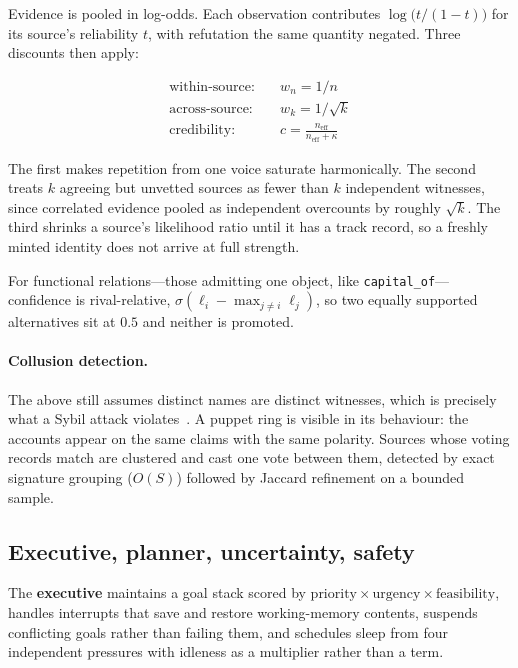 \documentclass[10pt,twocolumn]{article}
\begin{document}
Evidence is pooled in log-odds. Each observation contributes
$\log\!\big(t/(1-t)\big)$ for its source's reliability $t$, with refutation the
same quantity negated. Three discounts then apply:

\begin{align}
\text{within-source:} \quad & w_n = 1/n \\
\text{across-source:} \quad & w_k = 1/\sqrt{k} \\
\text{credibility:} \quad & c = \tfrac{n_{\text{eff}}}{n_{\text{eff}} + \kappa}
\end{align}

The first makes repetition from one voice saturate harmonically. The second
treats $k$ agreeing but unvetted sources as fewer than $k$ independent
witnesses, since correlated evidence pooled as independent overcounts by
roughly $\sqrt{k}$. The third shrinks a source's likelihood ratio until it has
a track record, so a freshly minted identity does not arrive at full strength.

For functional relations---those admitting one object, like
\texttt{capital\_of}---confidence is rival-relative,
$\sigma(\ell_i - \max_{j\neq i}\ell_j)$, so two equally supported alternatives
sit at $0.5$ and neither is promoted.

\paragraph{Collusion detection.} The above still assumes distinct names are
distinct witnesses, which is precisely what a Sybil attack
violates~\cite{douceur2002}. A puppet ring is visible in its behaviour: the
accounts appear on the same claims with the same polarity. Sources whose voting
records match are clustered and cast one vote between them, detected by exact
signature grouping ($O(S)$) followed by Jaccard refinement on a bounded sample.

\subsection{Executive, planner, uncertainty, safety}

The \textbf{executive} maintains a goal stack scored by
$\text{priority}\times\text{urgency}\times\text{feasibility}$, handles
interrupts that save and restore working-memory contents, suspends conflicting
goals rather than failing them, and schedules sleep from four independent
pressures with idleness as a multiplier rather than a term.
\end{document}
